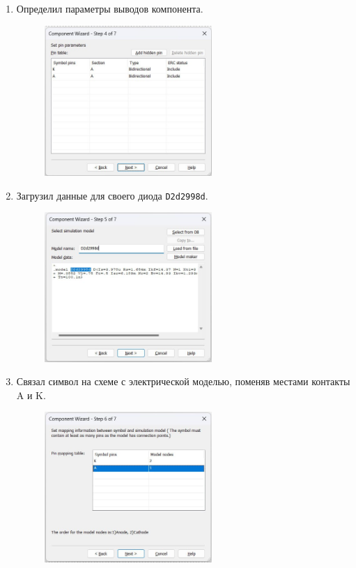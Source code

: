 \begin{enumerate}
\begin{figure}[H]
	\end{figure}
	\item Определил параметры выводов компонента.
	\begin{figure}[H]
		\centering
		\includegraphics[width=0.6\textwidth]{img/06.jpg}
	\end{figure}
	\newpage
	\item Загрузил данные для своего диода \texttt{D2d2998d}.
	\begin{figure}[H]
		\centering
		\includegraphics[width=0.6\textwidth]{img/07.jpg}
	\end{figure}
	\item Связал символ на схеме с электрической моделью, поменяв местами контакты A и K.
	\begin{figure}[H]
		\centering
		\includegraphics[width=0.6\textwidth]{img/08.jpg}

\end{figure}
\end{enumerate}
